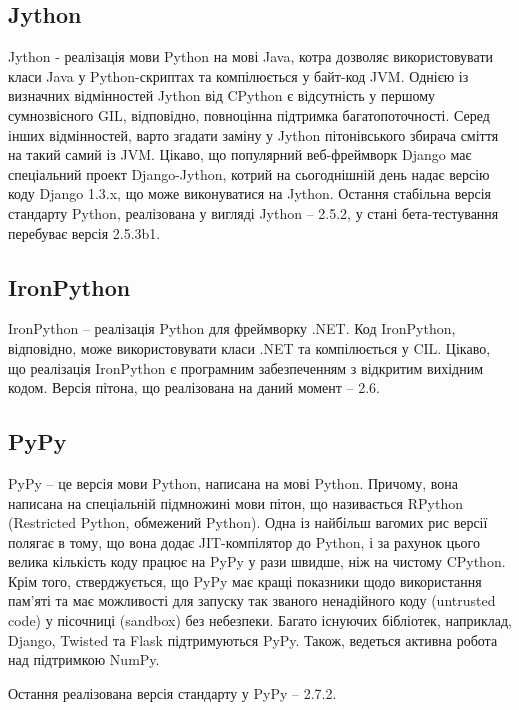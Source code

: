 \documentclass[a4paper, 12pt, onsedie]{article}
\begin{document}
\subsection{Jython}
Jython - реалізація мови Python на мові Java, котра дозволяє використовувати класи Java у 
Python-скриптах та компілюється у байт-код JVM. Однією із визначних відмінностей Jython від
CPython є відсутність у першому сумнозвісного GIL, відповідно, повноцінна підтримка 
багатопоточності. Серед інших відмінностей, варто згадати заміну у Jython пітонівського 
збирача сміття на такий самий із JVM.
Цікаво, що популярний веб-фреймворк Django має спеціальний проект Django-Jython, котрий на
сьогоднішній день надає версію коду Django 1.3.x, що може виконуватися на Jython.
Остання стабільна версія стандарту Python, реалізована у вигляді Jython -- 2.5.2, у стані 
бета-тестування перебуває версія 2.5.3b1.

\subsection{IronPython}
IronPython -- реалізація Python для фреймворку .NET. Код IronPython, відповідно, може 
використовувати класи .NET та компілюється у CIL. Цікаво, що реалізація IronPython є 
програмним забезпеченням з відкритим вихідним кодом. Версія пітона, що реалізована на даний 
момент -- 2.6.

\subsection{PyPy}
PyPy -- це версія мови Python, написана на мові Python. Причому, вона написана на спеціальній 
підмножині мови пітон, що називається RPython (Restricted Python, обмежений Python). Одна 
із найбільш вагомих рис версії полягає в тому, що вона додає JIT-компілятор до Python, і за 
рахунок цього велика кількість коду працює на PyPy у рази швидше, ніж на чистому CPython. 
Крім того, стверджується, що PyPy має кращі показники щодо використання пам'яті та має 
можливості для запуску так званого ненадійного коду (untrusted code) у пісочниці (sandbox) 
без небезпеки. Багато існуючих бібліотек, наприклад, Django, Twisted та Flask підтримуються 
PyPy. Також, ведеться активна робота над підтримкою NumPy.

Остання реалізована версія стандарту у PyPy -- 2.7.2.
\end{document}
